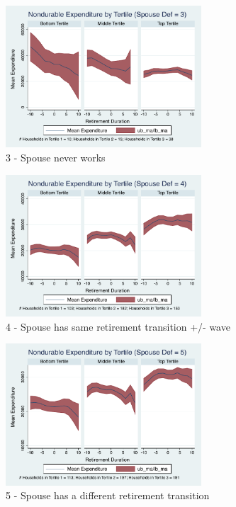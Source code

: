 \documentclass[11pt,onecolumn]{article}
\numberwithin{figure}{section}
\begin{document}
\begin{figure}[h]
	\caption{3 - Spouse never works}
	\centering
	\includegraphics[width=0.65\textwidth]{../ConsumptionPostRetirement_by_SpouseDef/Smoothed/spouse_def_3.pdf}
\end{figure}

\begin{figure}[h]
	\caption{4 - Spouse has same retirement transition +/- wave}
	\centering
	\includegraphics[width=0.65\textwidth]{../ConsumptionPostRetirement_by_SpouseDef/Smoothed/spouse_def_4.pdf}
\end{figure}
\clearpage

\begin{figure}[h]
	\caption{5 - Spouse has a different retirement transition}
	\centering
	\includegraphics[width=0.65\textwidth]{../ConsumptionPostRetirement_by_SpouseDef/Smoothed/spouse_def_5.pdf}
\end{figure}
\end{document}
